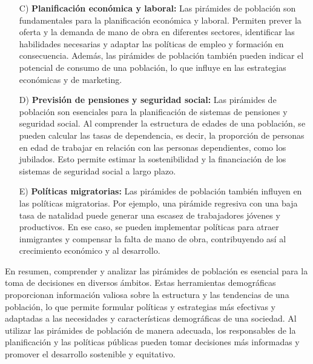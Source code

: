 \documentclass[8pt,a4paper]{beamer}
\begin{document}
{\begin{frame}{}
\begin{block}{}
\justifying
\begin{enumerate}
\justifying
\item[C)] \textbf{Planificación económica y laboral:} Las pirámides de población son fundamentales para la planificación económica y laboral. Permiten prever la oferta y la demanda de mano de obra en diferentes sectores, identificar las habilidades necesarias y adaptar las políticas de empleo y formación en consecuencia. Además, las pirámides de población también pueden indicar el potencial de consumo de una población, lo que influye en las estrategias económicas y de marketing.

\item[D)] \textbf{Previsión de pensiones y seguridad social:} Las pirámides de población son esenciales para la planificación de sistemas de pensiones y seguridad social. Al comprender la estructura de edades de una población, se pueden calcular las tasas de dependencia, es decir, la proporción de personas en edad de trabajar en relación con las personas dependientes, como los jubilados. Esto permite estimar la sostenibilidad y la financiación de los sistemas de seguridad social a largo plazo.

\item[E)] \textbf{Políticas migratorias:} Las pirámides de población también influyen en las políticas migratorias. Por ejemplo, una pirámide regresiva con una baja tasa de natalidad puede generar una escasez de trabajadores jóvenes y productivos. En ese caso, se pueden implementar políticas para atraer inmigrantes y compensar la falta de mano de obra, contribuyendo así al crecimiento económico y al desarrollo.
\end{enumerate}
\end{block}
\end{frame}


\begin{frame}{}
\begin{block}{}
\justifying
En resumen, comprender y analizar las pirámides de población es esencial para la toma de decisiones en diversos ámbitos. Estas herramientas demográficas proporcionan información valiosa sobre la estructura y las tendencias de una población, lo que permite formular políticas y estrategias más efectivas y adaptadas a las necesidades y características demográficas de una sociedad. Al utilizar las pirámides de población de manera adecuada, los responsables de la planificación y las políticas públicas pueden tomar decisiones más informadas y promover el desarrollo sostenible y equitativo.


\end{block}
\end{frame}}
\end{document}

